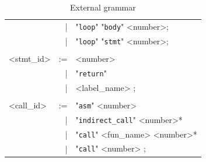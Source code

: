 \documentclass{frama-c-book}
\begin{document}
\begin{table}[!ht]
\begin{center}
\begin{tabular}{|lrl|}
           &   |& "{\tt\/loop}" "{\tt\/body}" <number>;\\
           &   |& "{\tt\/loop}" "{\tt\/stmt}" <number>;\\
           &    &\\
<stmt\_id>  & := & <number> \\
           &   |& "{\tt\/return}" \\
           &   |& <label\_name> ;\\
           &    &\\
<call\_id>  & := &"{\tt\/asm}" <number> \\
           &   |& "{\tt\/indirect\_call}" <number>* \\
           &   |& "{\tt\/call}" <fun\_name> <number>*  \\
           &   |& "{\tt\/call}" <number> ;\\

\hline
\end{tabular}
\end{center}
\caption{External \acsl grammar}
\label{grammar}
\end{table}
\end{document}

